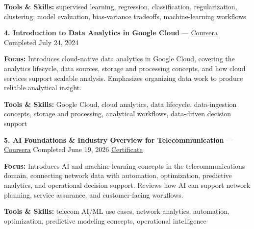 \documentclass[9pt,letterpaper]{extarticle}
\begin{document}
{\small\textbf{Tools \& Skills:} supervised learning, regression, classification, regularization, clustering, model evaluation, bias-variance tradeoffs, machine-learning workflows\par}
\vspace{2pt}
\noindent\textbf{4. Introduction to Data Analytics in Google Cloud} {\small --- \textcolor{blue}{\underline{\href{https://www.coursera.org/account/accomplishments/verify/R9FGPRZ3NJE8}{Coursera}}} \textbar{} Completed \textbar{} July 24, 2024}\par
\textbf{Focus:} Introduces cloud-native data analytics in Google Cloud, covering the analytics lifecycle, data sources, storage and processing concepts, and how cloud services support scalable analysis. Emphasizes organizing data work to produce reliable analytical insight.\par
{\small\textbf{Tools \& Skills:} Google Cloud, cloud analytics, data lifecycle, data-ingestion concepts, storage and processing, analytical workflows, data-driven decision support\par}
\vspace{2pt}
\noindent\textbf{5. AI Foundations \& Industry Overview for Telecommunication} {\small --- \textcolor{blue}{\underline{\href{https://www.coursera.org/account/accomplishments/verify/3900EVOH4I1Y}{Coursera}}} \textbar{} Completed \textbar{} June 19, 2026 \textbar{} \textcolor{blue}{\underline{\href{https://waseemraza844.github.io/portfolio/certificates/wireless/c1-ai-found-indus-overview.pdf}{Certificate}}}}\par
\textbf{Focus:} Introduces AI and machine-learning concepts in the telecommunications domain, connecting network data with automation, optimization, predictive analytics, and operational decision support. Reviews how AI can support network planning, service assurance, and customer-facing workflows.\par
{\small\textbf{Tools \& Skills:} telecom AI/ML use cases, network analytics, automation, optimization, predictive modeling concepts, operational intelligence\par}
\vspace{2pt}
\end{document}
